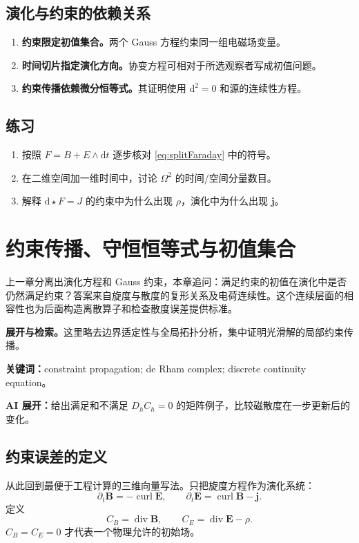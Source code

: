 \documentclass[UTF8,11pt,openany]{ctexbook}
\numberwithin{equation}{chapter}
\theoremstyle{definition}
\theoremstyle{remark}
\newcommand{\dd}{\mathrm d}
\newcommand{\Div}{\operatorname{div}}
\newcommand{\curl}{\operatorname{curl}}
\newcommand{\studyroute}[3]{%
  \par\smallskip\noindent\textbf{展开与检索。}#1\par
  \noindent\textbf{关键词：}#2。\par
  \noindent\textbf{AI 展开：}#3\par
}
\begin{document}
\section{演化与约束的依赖关系}
\begin{enumerate}
\item \textbf{约束限定初值集合。}两个 Gauss 方程约束同一组电磁场变量。
\item \textbf{时间切片指定演化方向。}协变方程可相对于所选观察者写成初值问题。
\item \textbf{约束传播依赖微分恒等式。}其证明使用 $\dd^2=0$ 和源的连续性方程。
\end{enumerate}

\section{练习}
\begin{enumerate}
\item 按照 $F=B+E\wedge\dd t$ 逐步核对 \eqref{eq:splitFaraday} 中的符号。
\item 在二维空间加一维时间中，讨论 $\Omega^2$ 的时间/空间分量数目。
\item 解释 $\dd\star F=J$ 的约束中为什么出现 $\rho$，演化中为什么出现 $\bm j$。
\end{enumerate}

\chapter{约束传播、守恒恒等式与初值集合}
\label{ch:constraint}
\begin{chaptersummary}
上一章分离出演化方程和 Gauss 约束，本章追问：满足约束的初值在演化中是否仍然满足约束？答案来自旋度与散度的复形关系及电荷连续性。这个连续层面的相容性也为后面构造离散算子和检查散度误差提供标准。
\end{chaptersummary}
\studyroute{这里略去边界适定性与全局拓扑分析，集中证明光滑解的局部约束传播。}{constraint propagation; de Rham complex; discrete continuity equation}{给出满足和不满足 $D_hC_h=0$ 的矩阵例子，比较磁散度在一步更新后的变化。}
\section{约束误差的定义}
从此回到最便于工程计算的三维向量写法。只把旋度方程作为演化系统：
\begin{equation}\label{eq:evol}
\partial_t\bm B=-\curl\bm E,
\qquad
\partial_t\bm E=\curl\bm B-\bm j.
\end{equation}
定义
\begin{equation}
C_B=\Div\bm B,\qquad C_E=\Div\bm E-\rho.
\end{equation}
$C_B=C_E=0$ 才代表一个物理允许的初始场。
\end{document}
